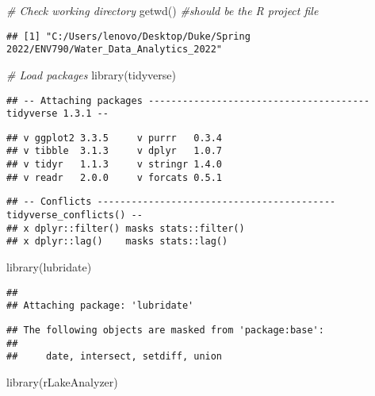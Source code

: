 \documentclass[
]{article}
\newenvironment{Shaded}{\begin{snugshade}}{\end{snugshade}}
\newcommand{\CommentTok}[1]{\textcolor[rgb]{0.56,0.35,0.01}{\textit{#1}}}
\newcommand{\FunctionTok}[1]{\textcolor[rgb]{0.00,0.00,0.00}{#1}}
\newcommand{\NormalTok}[1]{#1}
\begin{document}
\begin{Shaded}
\begin{Highlighting}[]
\CommentTok{\# Check working directory}
\FunctionTok{getwd}\NormalTok{() }\CommentTok{\#should be the R project file}
\end{Highlighting}
\end{Shaded}

\begin{verbatim}
## [1] "C:/Users/lenovo/Desktop/Duke/Spring 2022/ENV790/Water_Data_Analytics_2022"
\end{verbatim}

\begin{Shaded}
\begin{Highlighting}[]
\CommentTok{\# Load packages}
\FunctionTok{library}\NormalTok{(tidyverse)}
\end{Highlighting}
\end{Shaded}

\begin{verbatim}
## -- Attaching packages --------------------------------------- tidyverse 1.3.1 --
\end{verbatim}

\begin{verbatim}
## v ggplot2 3.3.5     v purrr   0.3.4
## v tibble  3.1.3     v dplyr   1.0.7
## v tidyr   1.1.3     v stringr 1.4.0
## v readr   2.0.0     v forcats 0.5.1
\end{verbatim}

\begin{verbatim}
## -- Conflicts ------------------------------------------ tidyverse_conflicts() --
## x dplyr::filter() masks stats::filter()
## x dplyr::lag()    masks stats::lag()
\end{verbatim}

\begin{Shaded}
\begin{Highlighting}[]
\FunctionTok{library}\NormalTok{(lubridate)}
\end{Highlighting}
\end{Shaded}

\begin{verbatim}
## 
## Attaching package: 'lubridate'
\end{verbatim}

\begin{verbatim}
## The following objects are masked from 'package:base':
## 
##     date, intersect, setdiff, union
\end{verbatim}

\begin{Shaded}
\begin{Highlighting}[]
\FunctionTok{library}\NormalTok{(rLakeAnalyzer)}
\end{Highlighting}
\end{Shaded}
\end{document}
